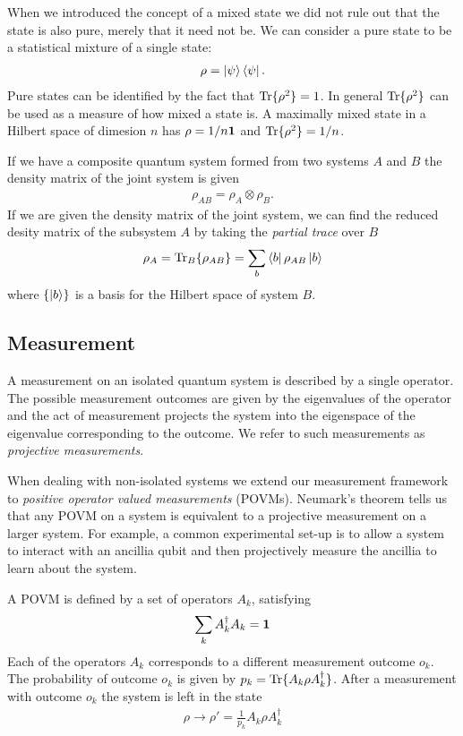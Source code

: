 When we introduced the concept of a mixed state we did not rule out that the state is also pure, merely that it need not be. We can consider a pure state to be a statistical mixture of a single state:
\begin{align}
  \rho = \left\vert\psi\right\rangle\left\langle \psi\right\vert.
\end{align}
Pure states can be identified by the fact that $\operatorname{Tr}\{\rho^2\} = 1$. In general $\operatorname{Tr}\{\rho^2\}$ can be used as a measure of how mixed a state is. A maximally mixed state in a Hilbert space of dimesion $n$ has $\rho = 1/n\mathbf{1}$ and $\operatorname{Tr}\{\rho^2\} = 1/n$.

If we have a composite quantum system formed from two systems $A$ and $B$ the density matrix of the joint system is given
\begin{align}
  \rho_{AB} = \rho_A \otimes \rho_B. 
\end{align}
If we are given the density matrix of the joint system, we can find the reduced desity matrix of the subsystem $A$ by taking the \textit{partial trace} over $B$
\begin{align}
  \rho_A = \operatorname{Tr}_B\{\rho_{AB}\} = \sum_b \left\langle b\right\vert\rho_{AB}\left\vert b\right\rangle
\end{align}
where $\{\left\vert b\right\rangle\}$ is a basis for the Hilbert space of system $B$. 

\subsection{Measurement}

A measurement on an isolated quantum system is described by a single operator. The possible measurement outcomes are given by the eigenvalues of the operator and the act of measurement projects the system into the eigenspace of the eigenvalue corresponding to the outcome. We refer to such measurements as \textit{projective measurements}.

When dealing with non-isolated systems we extend our measurement framework to \textit{positive operator valued measurements} (POVMs). Neumark's theorem \cite{?} tells us that any POVM on a system is equivalent to a projective measurement on a larger system. For example, a common experimental set-up is to allow a system to interact with an ancillia qubit and then projectively measure the ancillia to learn about the system.

A POVM  is defined by a set of operators $A_k$, satisfying
\begin{align}
  \label{POVM_completeness_eq}
  \sum_k A_k^\dagger A_k = \mathbf{1}
\end{align}
Each of the operators $A_k$ corresponds to a different measurement outcome $o_k$. The probability of outcome $o_k$ is given by $p_k = \operatorname{Tr}\{A_k \rho A_k^\dagger\}$. After a measurement with outcome $o_k$ the system is left in the state
\begin{align}\label{POVM_normalisation_eq}
  \rho \rightarrow \rho' = \frac{1}{p_k} A_k \rho A_k^\dagger
\end{align}

